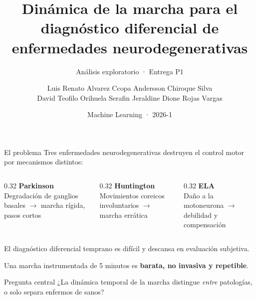 \documentclass[aspectratio=169,10pt]{beamer}
\title{\bfseries Dinámica de la marcha para el diagnóstico diferencial de enfermedades neurodegenerativas}
\subtitle{Análisis exploratorio · Entrega P1}
\author{Luis Renato Alvarez Ccopa \quad Andersson Chiroque Silva \\[0.3em] David Teofilo Orihuela Serafin \quad Jeraldine Dione Rojas Vargas}
\institute{Universidad de Ingeniería y Tecnología}
\date{Machine Learning · 2026-1}
\begin{document}
\begin{frame}[plain]
  \titlepage
\end{frame}

\begin{frame}{El problema}
  Tres enfermedades neurodegenerativas destruyen el control motor por mecanismos distintos:

  \vspace{1em}
  \begin{columns}[T]
    \begin{column}{0.32\textwidth}
      \textbf{\color{park}Parkinson}\\[0.3em]
      Degradación de ganglios basales $\rightarrow$ marcha rígida, pasos cortos
    \end{column}
    \begin{column}{0.32\textwidth}
      \textbf{\color{hunt}Huntington}\\[0.3em]
      Movimientos coreicos involuntarios $\rightarrow$ marcha errática
    \end{column}
    \begin{column}{0.32\textwidth}
      \textbf{\color{als}ELA}\\[0.3em]
      Daño a la motoneurona $\rightarrow$ debilidad y compensación
    \end{column}
  \end{columns}

  \vspace{1.5em}
  El diagnóstico diferencial temprano es difícil y descansa en evaluación subjetiva.

  \vspace{0.5em}
  Una marcha instrumentada de 5 minutos es \textbf{barata, no invasiva y repetible}.

  \vspace{1em}
  \begin{block}{Pregunta central}
    ¿La dinámica temporal de la marcha distingue \emph{entre} patologías, o solo separa enfermos de sanos?
  \end{block}
\end{frame}
\end{document}
